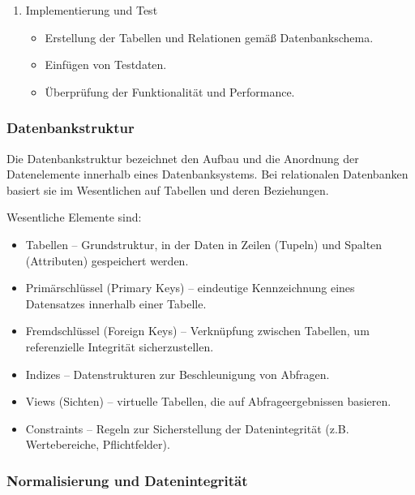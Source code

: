\begin{enumerate}
\begin{itemize}
\end{itemize}

\item
Implementierung und Test

\begin{itemize}

\item
Erstellung der Tabellen und Relationen gemäß Datenbankschema.

\item
Einfügen von Testdaten.

\item
Überprüfung der Funktionalität und Performance.

\end{itemize}

\end{enumerate}


\subsubsection{Datenbankstruktur}

Die Datenbankstruktur bezeichnet den Aufbau und die Anordnung der Datenelemente innerhalb eines Datenbanksystems.
Bei relationalen Datenbanken basiert sie im Wesentlichen auf Tabellen und deren Beziehungen.

Wesentliche Elemente sind:


\begin{itemize}

\item
Tabellen – Grundstruktur, in der Daten in Zeilen (Tupeln) und Spalten (Attributen) gespeichert werden.
\item
Primärschlüssel (Primary Keys) – eindeutige Kennzeichnung eines Datensatzes innerhalb einer Tabelle.
\item
Fremdschlüssel (Foreign Keys) – Verknüpfung zwischen Tabellen, um referenzielle Integrität sicherzustellen.
\item
Indizes – Datenstrukturen zur Beschleunigung von Abfragen.
\item
Views (Sichten) – virtuelle Tabellen, die auf Abfrageergebnissen basieren.
\item
Constraints – Regeln zur Sicherstellung der Datenintegrität (z.B. Wertebereiche, Pflichtfelder).

\end{itemize}

\subsubsection{Normalisierung und Datenintegrität}

